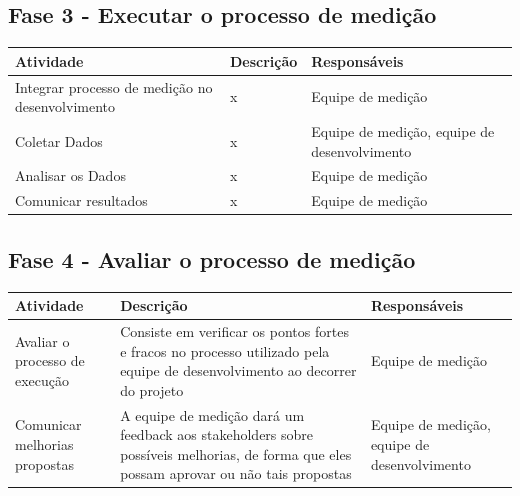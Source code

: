 \subsection{Fase 3 - Executar o processo de medição}

	\begin{tabular}{ |p{4cm}|p{6cm}| p{3cm} |}
	 \hline
	 Atividade 		& 		Descrição & Responsáveis \\
	 \hline
	 	Integrar processo de medição no desenvolvimento & x &  Equipe de medição \\
	 \hline
	 	Coletar Dados & x &  Equipe de medição, equipe de desenvolvimento \\
	 \hline
	 	Analisar os Dados & x &  Equipe de medição \\
	 \hline
	 	Comunicar resultados & x &  Equipe de medição \\
	 \hline
	\end{tabular}

\subsection{Fase 4 - Avaliar o processo de medição}

	\begin{tabular}{ |p{4cm}|p{6cm}| p{3cm} |}

	 \hline
	 Atividade 		& 		Descrição & Responsáveis \\
	 \hline
	 	Avaliar o processo de execução & Consiste em verificar os pontos fortes e fracos no processo utilizado pela equipe de desenvolvimento ao decorrer do projeto &  Equipe de medição \\
	 \hline
	 	Comunicar melhorias propostas & A equipe de medição dará um feedback aos stakeholders sobre possíveis melhorias, de forma que eles possam aprovar ou não tais propostas &  Equipe de medição, equipe de desenvolvimento \\
	 \hline

	\end{tabular}
